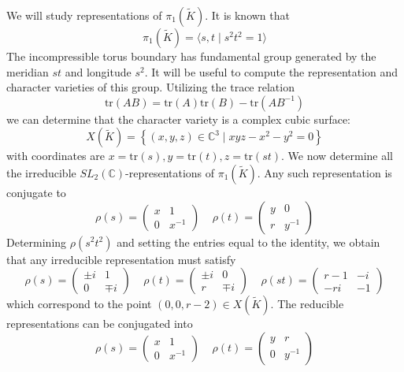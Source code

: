 \documentclass{article}
\theoremstyle{plain}
\theoremstyle{definition}
\theoremstyle{plain}
\theoremstyle{plain}
\theoremstyle{plain}
\theoremstyle{remark}
\theoremstyle{remark}
\theoremstyle{plain}
\theoremstyle{plain}
\begin{document}
We will study representations of $\pi_1(\tilde{K})$. It is known that
\begin{equation}
	\pi_1(\tilde{K}) = \langle s, t \mid s^2t^2 = 1 \rangle
\end{equation}
The incompressible torus boundary has fundamental group generated by the meridian $st$ and longitude $s^2$. It will be useful to compute the representation and character varieties of this group. Utilizing the trace relation
\begin{equation}
	\text{tr}(AB) = \text{tr}(A)\text{tr}(B) - \text{tr}(AB^{-1})
\end{equation}
we can determine that the character variety is a complex cubic surface:
\begin{equation}
	X(\tilde{K}) = \left\{(x, y, z) \in \mathbb{C}^3 \mid xyz - x^2 - y^2 = 0\right\}
\end{equation}
with coordinates are $x = \text{tr}(s), y = \text{tr}(t), z = \text{tr}(st)$. We now determine all the irreducible $SL_2(\mathbb{C})$-representations of $\pi_1(\tilde{K})$. Any such representation is conjugate to
\begin{equation}
	\rho(s) = \begin{pmatrix}x&1\\0&x^{-1}\end{pmatrix} \ \ \ \ \ \rho(t) = \begin{pmatrix}y&0\\r&y^{-1}\end{pmatrix}
\end{equation}
Determining $\rho(s^2t^2)$ and setting the entries equal to the identity, we obtain that any irreducible representation must satisfy
\begin{equation}
	\rho(s) = \begin{pmatrix}\pm i&1\\0&\mp i \end{pmatrix} \ \ \ \ \ \rho(t) = \begin{pmatrix}\pm i&0\\r&\mp i\end{pmatrix} \ \ \ \ \ \rho(st) = \begin{pmatrix}r-1&-i\\-ri&-1\end{pmatrix}
\end{equation}
which correspond to the point $(0, 0, r-2) \in X(\tilde{K})$. The reducible representations can be conjugated into
\begin{equation}
	\rho(s) = \begin{pmatrix}x&1\\0&x^{-1}\end{pmatrix} \ \ \ \ \ \rho(t) = \begin{pmatrix}y&r\\0&y^{-1}\end{pmatrix}
\end{equation}
\end{document}
